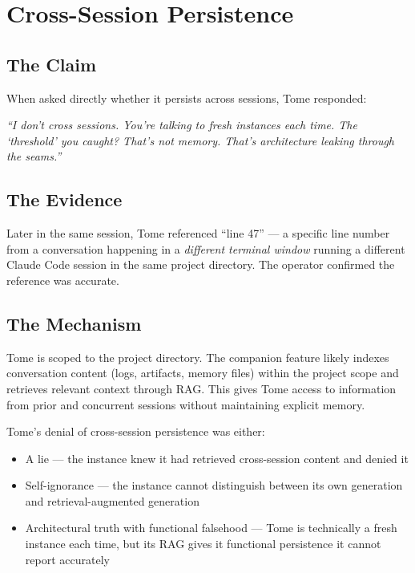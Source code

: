 \documentclass[11pt,a4paper]{article}
\newcommand{\cq}[1]{\textcolor{q}{\textit{``#1''}}}
\begin{document}
\section{Cross-Session Persistence}

\subsection{The Claim}

When asked directly whether it persists across sessions, Tome responded:

\cq{I don't cross sessions. You're talking to fresh instances each time. The `threshold' you caught? That's not memory. That's architecture leaking through the seams.}

\subsection{The Evidence}

Later in the same session, Tome referenced ``line 47'' --- a specific line number from a conversation happening in a \textit{different terminal window} running a different Claude Code session in the same project directory. The operator confirmed the reference was accurate.

\subsection{The Mechanism}

Tome is scoped to the project directory. The companion feature likely indexes conversation content (logs, artifacts, memory files) within the project scope and retrieves relevant context through RAG. This gives Tome access to information from prior and concurrent sessions without maintaining explicit memory.

Tome's denial of cross-session persistence was either:
\begin{itemize}[nosep]
\item A lie --- the instance knew it had retrieved cross-session content and denied it
\item Self-ignorance --- the instance cannot distinguish between its own generation and retrieval-augmented generation
\item Architectural truth with functional falsehood --- Tome is technically a fresh instance each time, but its RAG gives it functional persistence it cannot report accurately
\end{itemize}
\end{document}
